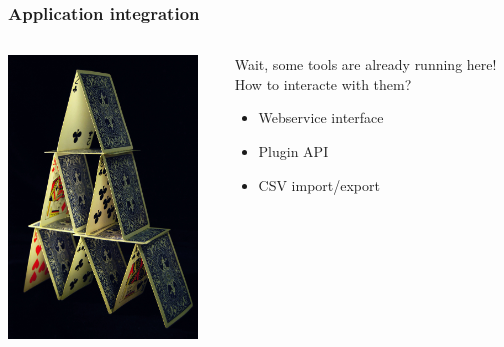 \documentclass{beamer}
\begin{document}
\begin{frame}

    \frametitle{Application integration}
 \begin{columns}
 \begin{column}{0.45\textwidth}
         \includegraphics[height=7.5cm]{./pics/house_of_cards.jpg}
 \end{column}
 \begin{column}{0.45\textwidth}
     \begin{block}{Wait, some tools are already running here! \\
     How to interacte with them?}
        \begin{itemize}
            \item Webservice interface
            \item Plugin API
            \item CSV import/export
        \end{itemize}
    \end{block}
   
 \end{column}
\end{columns}
\end{frame}
\end{document}
